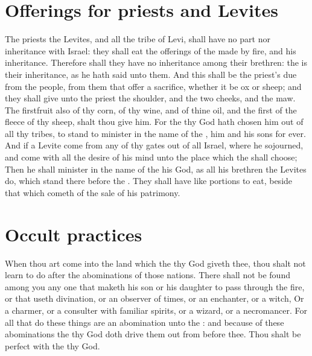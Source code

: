 \section*{Offerings for priests and Levites}
\begin{biblechapter} %
\verse The priests the Levites, and all the tribe of Levi, shall have no part nor inheritance with Israel: they shall eat the offerings of the \LORD made by fire, and his inheritance.
\verse Therefore shall they have no inheritance among their brethren: the \LORD is their inheritance, as he hath said unto them.
\verse And this shall be the priest's due from the people, from them that offer a sacrifice, whether it be ox or sheep; and they shall give unto the priest the shoulder, and the two cheeks, and the maw.
\verse The firstfruit also of thy corn, of thy wine, and of thine oil, and the first of the fleece of thy sheep, shalt thou give him.
\verse For the \LORD thy God hath chosen him out of all thy tribes, to stand to minister in the name of the \LORD, him and his sons for ever.
\verse And if a Levite come from any of thy gates out of all Israel, where he sojourned, and come with all the desire of his mind unto the place which the \LORD shall choose;
\verse Then he shall minister in the name of the \LORD his God, as all his brethren the Levites do, which stand there before the \LORD.
\verse They shall have like portions to eat, beside that which cometh of the sale of his patrimony.
\section*{Occult practices}
\verse When thou art come into the land which the \LORD thy God giveth thee, thou shalt not learn to do after the abominations of those nations.
\verse There shall not be found among you any one that maketh his son or his daughter to pass through the fire, or that useth divination, or an observer of times, or an enchanter, or a witch,
\verse Or a charmer, or a consulter with familiar spirits, or a wizard, or a necromancer.
\verse For all that do these things are an abomination unto the \LORD: and because of these abominations the \LORD thy God doth drive them out from before thee.
\verse Thou shalt be perfect with the \LORD thy God.

\end{biblechapter}

